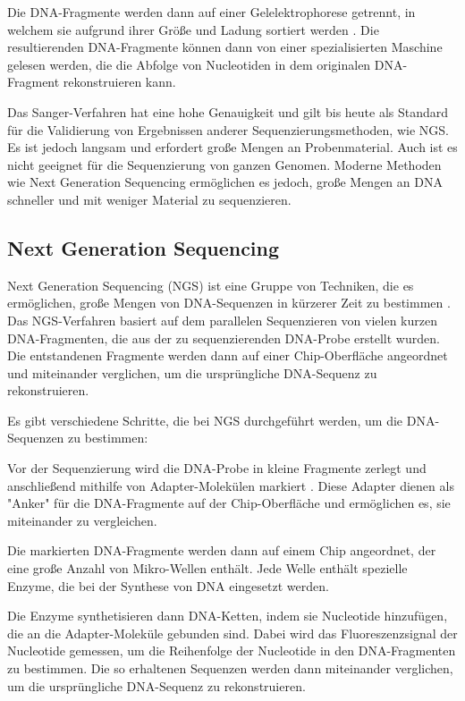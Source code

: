\documentclass[oneside,bibliography=totocnumbered,BCOR=5mm]{scrbook}%
\theoremstyle{definition}
\theoremstyle{definition}
\theoremstyle{definition}
\theoremstyle{definition}
\theoremstyle{definition}
\theoremstyle{definition}
\begin{document}
Die DNA-Fragmente werden dann auf einer Gelelektrophorese getrennt, 
in welchem sie aufgrund ihrer Größe und Ladung sortiert werden \autocite[Seite 2]{metzker2005}. 
Die resultierenden DNA-Fragmente können dann von einer spezialisierten Maschine gelesen werden, 
die die Abfolge von Nucleotiden in dem originalen DNA-Fragment rekonstruieren kann.


Das Sanger-Verfahren hat eine hohe Genauigkeit und gilt bis heute als Standard für die Validierung von 
Ergebnissen anderer Sequenzierungsmethoden, wie NGS. 
Es ist jedoch langsam und erfordert große Mengen an Probenmaterial. 
Auch ist es nicht geeignet für die Sequenzierung von ganzen Genomen. 
Moderne Methoden wie Next Generation Sequencing ermöglichen es jedoch, große Mengen an DNA schneller und mit weniger Material zu sequenzieren.


\subsection{Next Generation Sequencing}
Next Generation Sequencing (NGS) ist eine Gruppe von Techniken, die es ermöglichen, große Mengen 
von DNA-Sequenzen in kürzerer Zeit zu bestimmen \autocite[Seite 278]{NGS}. 
Das NGS-Verfahren basiert auf dem parallelen Sequenzieren von vielen kurzen DNA-Fragmenten, 
die aus der zu sequenzierenden DNA-Probe erstellt wurden. 
Die entstandenen Fragmente werden dann auf einer Chip-Oberfläche angeordnet und miteinander verglichen, 
um die ursprüngliche DNA-Sequenz zu rekonstruieren.


Es gibt verschiedene Schritte, die bei NGS durchgeführt werden, um die DNA-Sequenzen zu bestimmen:


Vor der Sequenzierung wird die DNA-Probe in kleine Fragmente zerlegt und anschließend mithilfe von 
Adapter-Molekülen markiert \autocite[Seite 279]{NGS}.
Diese Adapter dienen als "Anker" für die DNA-Fragmente auf der Chip-Oberfläche und ermöglichen es, 
sie miteinander zu vergleichen.


Die markierten DNA-Fragmente werden dann auf einem Chip angeordnet, 
der eine große Anzahl von Mikro-Wellen enthält. 
Jede Welle enthält spezielle Enzyme, die bei der Synthese von DNA eingesetzt werden.


Die Enzyme synthetisieren dann DNA-Ketten, indem sie Nucleotide hinzufügen, 
die an die Adapter-Moleküle gebunden sind. Dabei wird das Fluoreszenzsignal der Nucleotide gemessen, 
um die Reihenfolge der Nucleotide in den DNA-Fragmenten zu bestimmen.
Die so erhaltenen Sequenzen werden dann miteinander verglichen, um die ursprüngliche DNA-Sequenz zu rekonstruieren.
\end{document}
